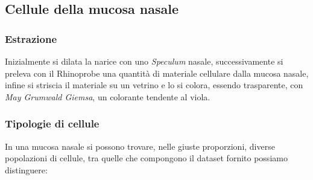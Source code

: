 \documentclass[italian,10pt,a4paper]{article}
\begin{document}
			\subsection{Cellule della mucosa nasale}
			
				\subsubsection{Estrazione}
					Inizialmente si dilata la narice con uno \textit{Speculum} nasale, successivamente si preleva con il Rhinoprobe una quantità di materiale cellulare dalla mucosa nasale, infine si striscia il materiale su un vetrino e lo si colora, essendo trasparente, con \textit{May Grumwald Giemsa}, un colorante tendente al viola.
					
			
				\subsubsection{Tipologie di cellule}
					In una mucosa nasale si possono trovare, nelle giuste proporzioni, diverse popolazioni di cellule, tra quelle che compongono il dataset fornito possiamo distinguere:
					
\end{document}
